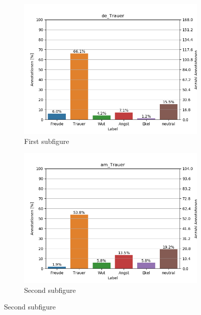 \documentclass[11pt,a4paper,headsepline,twoside,toc=bibliography]{scrreprt}
\begin{document}
\begin{figure}[t!] %
	\begin{subfigure}{0.48\textwidth}
		\includegraphics[width=\linewidth]{plots/de_Trauer.png}
		\caption{First subfigure} \label{fig:de_T}
	\end{subfigure}\hspace*{\fill}
	\begin{subfigure}{0.48\textwidth}
		\includegraphics[width=\linewidth]{plots/am_Trauer.png}
		\caption{Second subfigure} \label{fig:am_T}
	\end{subfigure}
	

\end{figure}
\end{document}
